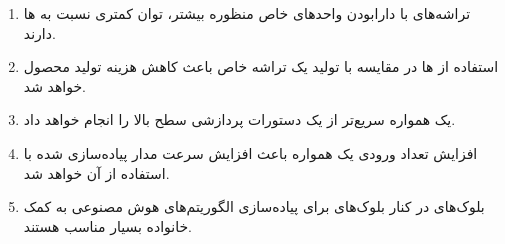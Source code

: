 \begin{enumerate}
\begin{qsolve}
	\end{qsolve}
	
	
	
	
	\item 
	تراشه‌های  با دارابودن واحدهای خاص منظوره بیشتر، توان کمتری نسبت به ها دارند.
	\begin{qsolve}
		
	\end{qsolve}
	
	
	
	
	\item 
	استفاده از ها در مقایسه با تولید یک تراشه خاص باعث کاهش هزینه تولید محصول خواهد شد.
	\begin{qsolve}
		
	\end{qsolve}
	
	
	
	
	\item 
	یک  همواره سریع‌تر از یک  دستورات پردازشی سطح بالا را انجام خواهد داد.
	\begin{qsolve}
		
	\end{qsolve}
	
	
	
	\item 
	افزایش تعداد ورودی یک  همواره باعث افزایش سرعت مدار پیاده‌سازی شده با استفاده از آن خواهد شد.
	\begin{qsolve}
		
	\end{qsolve}
	
	
	
	
	\item 
	بلوک‌های  در کنار بلوک‌های  برای پیاده‌سازی الگوریتم‌های هوش مصنوعی به کمک  خانواده  بسیار مناسب هستند.
	\begin{qsolve}
		
	\end{qsolve}
	
	
\end{enumerate}